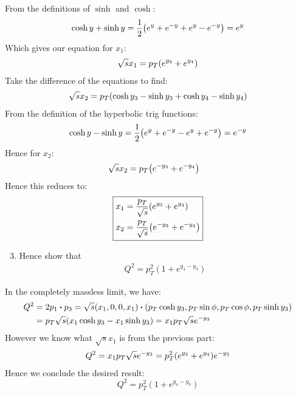 \documentclass[12pt]{article}
\begin{document}
From the definitions of $\sinh$ and $\cosh$:
\begin{align*}
  \cosh y+\sinh y=\frac12\qty(e^y+e^{-y}+e^y-e^{-y})=e^y
\end{align*}
Which gives our equation for $x_1$:
\begin{align*}
  \sqrt{s}x_1=p_T\qty(e^{y_3}+e^{y_4})
\end{align*}
Take the difference of the equations to find:
\begin{align*}
  \sqrt{s}x_2=p_T\qty(\cosh y_3-\sinh y_3+\cosh y_4-\sinh y_4)
\end{align*}
From the definition of the hyperbolic trig functions:
\begin{align*}
  \cosh y-\sinh y=\frac12\qty(e^y+e^{-y}-e^y+e^{-y})=e^{-y}
\end{align*}
Hence for $x_2$:
\begin{align*}
  \sqrt{s}x_2&=p_T\qty(e^{-y_3}+e^{-y_4})
\end{align*}
Hence this reduces to:
\begin{equation}
  \label{eq:p8b}
  \boxed{
    \begin{aligned}
      x_1&=\frac{p_T}{\sqrt{s}}\qty(e^{y_3}+e^{y_4})\\
      x_2&=\frac{p_T}{\sqrt{s}}\qty(e^{-y_3}+e^{-y_4})
    \end{aligned}
  }
\end{equation}
\begin{problem}
  \begin{enumerate}[label = (\alph*)]
    \setcounter{enumi}{2}
  \item Hence show that
    \begin{align*}
      Q^2=p_T^2(1+e^{y_4-y_3})
    \end{align*}
  \end{enumerate}
\end{problem}
In the completely massless limit, we have:
\begin{align*}
  Q^2&=2p_1\vdot p_3=\sqrt{s}(x_1,0,0,x_1)\vdot
  (p_T\cosh y_3,p_T\sin\phi,p_T\cos\phi,p_T\sinh y_3)\\
  &=p_T\sqrt{s}\qty(x_1\cosh y_3-x_1\sinh y_3)=x_1p_T\sqrt{s}e^{-y_3}
\end{align*}
However we know what $\sqrt{s}x_1$ is from the previous part:
\begin{align*}
  Q^2=x_1p_T\sqrt{s}e^{-y_3}=p_T^2\qty(e^{y_3}+e^{y_4})e^{-y_3}
\end{align*}
Hence we conclude the desired result:
\begin{equation}
  \label{eq:p8c}
  \boxed{Q^2=p_T^2(1+e^{y_4-y_3})}
\end{equation}
\end{document}
